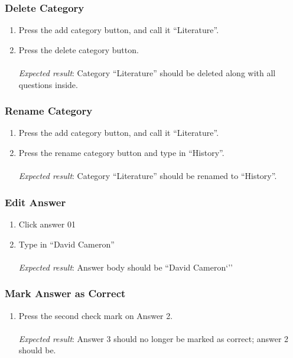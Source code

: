 \subsubsection{Delete Category}
\begin{enumerate}[leftmargin=*]
\item Press the add category button, and call it ``Literature''.
\item Press the delete category button.\\\\
\textit{Expected result}: Category ``Literature'' should be deleted along with all questions inside.
\end{enumerate}

\subsubsection{Rename Category}
\begin{enumerate}[leftmargin=*]
\item Press the add category button, and call it ``Literature''.
\item Press the rename category button and type in ``History''.\\\\
\textit{Expected result}: Category ``Literature'' should be renamed to ``History''.
\end{enumerate}

\subsubsection{Edit Answer}
\begin{enumerate}[leftmargin=*]
\item Click answer 01
\item Type in ``David Cameron''\\\\
\textit{Expected result}: Answer body should be ``David Cameron`''
\end{enumerate}

\subsubsection{Mark Answer as Correct}
\begin{enumerate}[leftmargin=*]
\item Press the second check mark on Answer 2.\\\\
\textit{Expected result}: Answer 3 should no longer be marked as correct; answer 2 should be.
\end{enumerate}

